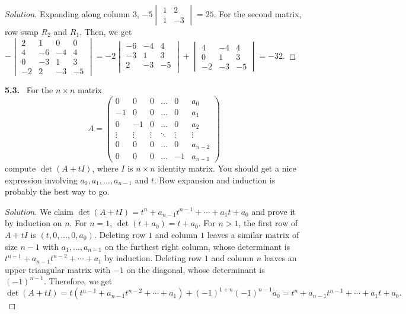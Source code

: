 \documentclass[12pt]{amsart}
\newcommand{\pmat}[1]{\begin{pmatrix}#1\end{pmatrix}}
\theoremstyle{plain}
\theoremstyle{definition}
\theoremstyle{remark}
\newenvironment{problem}[1]{\par\medskip\noindent\textbf{#1.}\ }{\par\smallskip}
\newenvironment{solution}{\begin{proof}[Solution]}{\end{proof}}
\begin{document}
\begin{solution}
  Expanding along column 3, $-5 \begin{vmatrix}
    1 & 2 \\ 1 & -3
  \end{vmatrix} = 25$. For the second matrix, row swap $R_2$ and $R_1$. Then, we get $-\begin{vmatrix}
    2 & 1 & 0 & 0 \\
    4 &-6 &-4 &4 \\
    0 &-3& 1& 3 \\
    -2 & 2 & -3 & -5
  \end{vmatrix} = -2\begin{vmatrix}
    -6&-4&4\\
    -3 &1& 3\\
    2 &-3& -5\\
  \end{vmatrix} + \begin{vmatrix}
    4 &-4& 4 \\
    0&1&3 \\
    -2 &-3& -5
  \end{vmatrix} = -32.$
\end{solution}

\begin{problem}{5.3}
For the $n\times n$ matrix
\[
  A = \pmat{
    0 & 0 & 0 & \dots & 0 & a_0 \\
    -1 & 0 & 0 & \dots & 0 & a_1 \\
    0 & -1 & 0 & \dots & 0 & a_2 \\
    \vdots & \vdots & \vdots & \ddots & \vdots & \vdots \\
    0 & 0 & 0 & \dots & 0 & a_{n-2} \\
    0 & 0 & 0 & \dots & -1 & a_{n-1}
  }
\]
compute $\det(A + tI)$, where $I$ is $n\times n$ identity matrix. You should get a nice expression involving $a_0, a_1, \dots, a_{n-1}$ and $t$. Row expansion and induction is probably the best way to go.
\end{problem}

\begin{solution}
  We claim $\det(A + tI) = t^n + a_{n-1}t^{n-1} + \cdots + a_1 t + a_0$ and prove it by induction on $n$. For $n = 1$, $\det(t + a_0) = t + a_0$.
  For $n > 1$, the first row of $A + tI$ is $(t, 0, \dots, 0, a_0)$. Deleting row $1$ and column $1$ leaves a similar matrix of size $n-1$ with $a_1, \dots, a_{n-1}$ on the furthest right column, whose determinant
is $t^{n-1} + a_{n-1}t^{n-2} + \cdots + a_1$ by induction. Deleting row $1$
and column $n$ leaves an upper triangular matrix with $-1$ on the diagonal,
whose determinant is $(-1)^{n-1}$. Therefore, we get
\[
  \det(A + tI)
  = t (t^{n-1} + a_{n-1}t^{n-2} + \cdots + a_1)
    + (-1)^{1+n}(-1)^{n-1}a_0
  = t^n + a_{n-1}t^{n-1} + \cdots + a_1 t + a_0.
\]
\end{solution}
\end{document}
